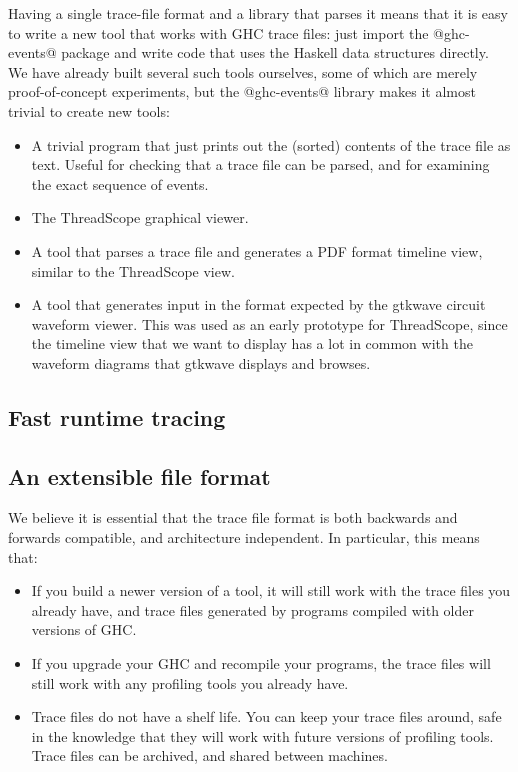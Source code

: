 \documentclass[twocolumn,9pt]{sigplanconf}
\begin{document}
Having a single trace-file format and a library that parses it means
that it is easy to write a new tool that works with GHC trace files:
just import the @ghc-events@ package and write code that uses the
Haskell data structures directly.  We have already built several such
tools ourselves, some of which are merely proof-of-concept
experiments, but the @ghc-events@ library makes it almost trivial to
create new tools:

\begin{itemize}
\item A trivial program that just prints out the (sorted) contents of
  the trace file as text.  Useful for checking that a trace file can
  be parsed, and for examining the exact sequence of events.

\item The ThreadScope graphical viewer.

\item A tool that parses a trace file and generates a PDF format
  timeline view, similar to the ThreadScope view.

\item A tool that generates input in the format expected by the
  gtkwave circuit waveform viewer.  This was used as an early
  prototype for ThreadScope, since the timeline view that we want to
  display has a lot in common with the waveform diagrams that gtkwave
  displays and browses.
\end{itemize}

\subsection{Fast runtime tracing}


\subsection{An extensible file format}

We believe it is essential that the trace file format is both
backwards and forwards compatible, and architecture independent.  In
particular, this means that:

\begin{itemize}
\item If you build a newer version of a tool, it will still work with
  the trace files you already have, and trace files generated by
  programs compiled with older versions of GHC.

\item If you upgrade your GHC and recompile your programs, the trace
  files will still work with any profiling tools you already have.

\item Trace files do not have a shelf life.  You can keep your trace
  files around, safe in the knowledge that they will work with future
  versions of profiling tools.  Trace files can be archived, and
  shared between machines.
\end{itemize}
\end{document}
